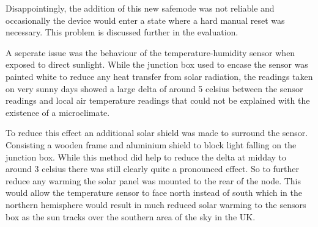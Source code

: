 Disappointingly, the addition of this new safemode was not reliable and
occasionally the device would enter a state where a hard manual reset was
necessary. This problem is discussed further in the evaluation.

A seperate issue was the behaviour of the temperature-humidity sensor when
exposed to direct sunlight. While the junction box used to encase the sensor was
painted white to reduce any heat transfer from solar radiation, the readings
taken on very sunny days showed a large delta of around 5 celsius between the
sensor readings and local air temperature readings that could not be explained
with the existence of a microclimate.

To reduce this effect an additional solar shield was made to surround the
sensor. Consisting a wooden frame and aluminium shield to block light falling on
the junction box. While this method did help to reduce the delta at midday to
around 3 celsius there was still clearly quite a pronounced effect. So to
further reduce any warming the solar panel was mounted to the rear of the node.
This would allow the temperature sensor to face north instead of south which in
the northern hemisphere would result in much reduced solar warming to the
sensors box as the sun tracks over the southern area of the sky in the UK.
